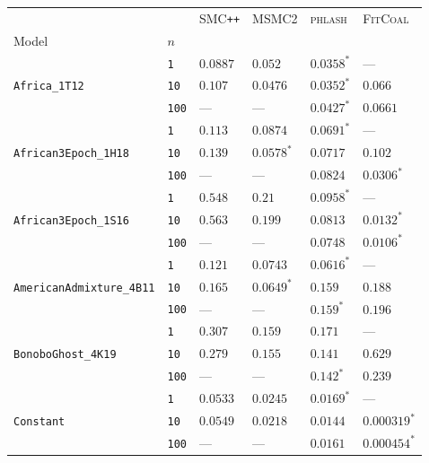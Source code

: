 \documentclass{article}
\begin{document}
\begin{footnotesize}
\begin{tabular}{llllll}
\toprule
 &  & \textsc{SMC}\texttt{{++}} & \textsc{MSMC2} & \textsc{phlash} & \textsc{FitCoal} \\
Model & $n$ &  &  &  &  \\
\midrule
\multirow[c]{3}{*}{\texttt{Africa\_1T12}} & \texttt{1} & $0.0887$ & $0.052$ & $\mathbf{0.0358}^*$ & --- \\
 & \texttt{10} & $0.107$ & $0.0476$ & $\mathbf{0.0352}^*$ & $0.066$ \\
 & \texttt{100} & --- & --- & $\mathbf{0.0427}^*$ & $0.0661$ \\
\cline{1-6}
\multirow[c]{3}{*}{\texttt{African3Epoch\_1H18}} & \texttt{1} & $0.113$ & $0.0874$ & $\mathbf{0.0691}^*$ & --- \\
 & \texttt{10} & $0.139$ & $\mathbf{0.0578}^*$ & $0.0717$ & $0.102$ \\
 & \texttt{100} & --- & --- & $0.0824$ & $\mathbf{0.0306}^*$ \\
\cline{1-6}
\multirow[c]{3}{*}{\texttt{African3Epoch\_1S16}} & \texttt{1} & $0.548$ & $0.21$ & $\mathbf{0.0958}^*$ & --- \\
 & \texttt{10} & $0.563$ & $0.199$ & $0.0813$ & $\mathbf{0.0132}^*$ \\
 & \texttt{100} & --- & --- & $0.0748$ & $\mathbf{0.0106}^*$ \\
\cline{1-6}
\multirow[c]{3}{*}{\texttt{AmericanAdmixture\_4B11}} & \texttt{1} & $0.121$ & $0.0743$ & $\mathbf{0.0616}^*$ & --- \\
 & \texttt{10} & $0.165$ & $\mathbf{0.0649}^*$ & $0.159$ & $0.188$ \\
 & \texttt{100} & --- & --- & $\mathbf{0.159}^*$ & $0.196$ \\
\cline{1-6}
\multirow[c]{3}{*}{\texttt{BonoboGhost\_4K19}} & \texttt{1} & $0.307$ & $\mathbf{0.159}$ & $0.171$ & --- \\
 & \texttt{10} & $0.279$ & $0.155$ & $\mathbf{0.141}$ & $0.629$ \\
 & \texttt{100} & --- & --- & $\mathbf{0.142}^*$ & $0.239$ \\
\cline{1-6}
\multirow[c]{3}{*}{\texttt{Constant}} & \texttt{1} & $0.0533$ & $0.0245$ & $\mathbf{0.0169}^*$ & --- \\
 & \texttt{10} & $0.0549$ & $0.0218$ & $0.0144$ & $\mathbf{0.000319}^*$ \\
 & \texttt{100} & --- & --- & $0.0161$ & $\mathbf{0.000454}^*$ \\
\cline{1-6}

\end{tabular}
\end{footnotesize}
\end{document}
